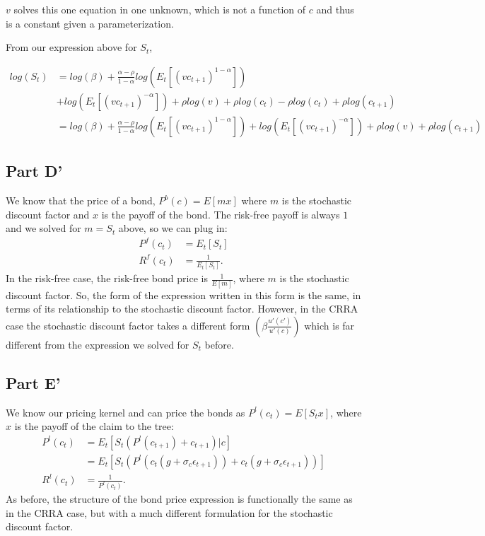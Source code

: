 \documentclass[11pt]{article} %
\begin{document}
$v$ solves this one equation in one unknown, which is not a function of $c$ and thus is a constant given a parameterization.

From our expression above for $S_t$,

\begin{align*}
log(S_t) &= log(\beta)+\frac{\alpha - \rho}{1-\alpha}log(E_t[(vc_{t+1})^{1-\alpha}]) \\
&+log(E_t[(vc_{t+1})^{-\alpha}]) + \rho log(v) + \rho log(c_t) - \rho log(c_t) + \rho log(c_{t+1})\\
&=log(\beta)+\frac{\alpha - \rho}{1-\alpha}log(E_t[(vc_{t+1})^{1-\alpha}]) +log(E_t[(vc_{t+1})^{-\alpha}]) + \rho log(v) + \rho log(c_{t+1})
\end{align*} 
\subsection{Part D'}
We know that the price of a bond, $P^b(c) = E[mx]$ where $m$ is the stochastic discount factor and $x$ is the payoff of the bond. The risk-free payoff is always $1$ and we solved for $m = S_t$ above, so we can plug in:
\begin{align*}
P^f(c_t) &= E_t[S_t] \\
R^f(c_t) &= \frac{1}{E_t[S_t]}.
\end{align*}
In the risk-free case, the risk-free bond price is $\frac{1}{E[m]}$, where $m$ is the stochastic discount factor. So, the form of the expression written in this form is the same, in terms of its relationship to the stochastic discount factor. However, in the CRRA case the stochastic discount factor takes a different form $\left( \beta\frac{u'(c')}{u'(c)} \right)$ which is far different from the expression we solved for $S_t$ before.
\subsection{Part E'}
We know our pricing kernel and can price the bonds as $P^l(c_t) = E[S_tx]$, where $x$ is the payoff of the claim to the tree:
\begin{align*}
P^l(c_t) &= E_t[S_t (P^l(c_{t+1}) +c_{t+1})|c] \\
&=  E_t[S_t (P^l(c_t(g+\sigma_c\epsilon_{t+1})) +c_t(g+\sigma_c\epsilon_{t+1}))]\\
R^l(c_t) &= \frac{1}{P^{l}(c_t)}.
\end{align*}
As before, the structure of the bond price expression is functionally the same as in the CRRA case, but with a much different formulation for the stochastic discount factor.
\end{document}
